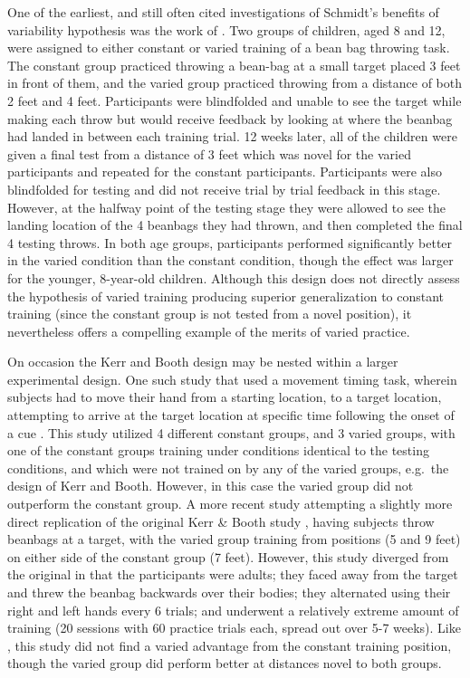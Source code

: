 \documentclass[
  12pt,
  letterpaper,
]{article}
\begin{document}
One of the earliest, and still often cited investigations of Schmidt's
benefits of variability hypothesis was the work of
\textcite{kerrSpecificVariedPractice1978}. Two groups of children, aged
8 and 12, were assigned to either constant or varied training of a bean
bag throwing task. The constant group practiced throwing a bean-bag at a
small target placed 3 feet in front of them, and the varied group
practiced throwing from a distance of both 2 feet and 4 feet.
Participants were blindfolded and unable to see the target while making
each throw but would receive feedback by looking at where the beanbag
had landed in between each training trial. 12 weeks later, all of the
children were given a final test from a distance of 3 feet which was
novel for the varied participants and repeated for the constant
participants. Participants were also blindfolded for testing and did not
receive trial by trial feedback in this stage. However, at the halfway
point of the testing stage they were allowed to see the landing location
of the 4 beanbags they had thrown, and then completed the final 4
testing throws. In both age groups, participants performed significantly
better in the varied condition than the constant condition, though the
effect was larger for the younger, 8-year-old children. Although this
design does not directly assess the hypothesis of varied training
producing superior generalization to constant training (since the
constant group is not tested from a novel position), it nevertheless
offers a compelling example of the merits of varied practice.

On occasion the Kerr and Booth design may be nested within a larger
experimental design. One such study that used a movement timing task,
wherein subjects had to move their hand from a starting location, to a
target location, attempting to arrive at the target location at specific
time following the onset of a cue
\autocite{wrisbergVariabilityPracticeHypothesis1987}. This study
utilized 4 different constant groups, and 3 varied groups, with one of
the constant groups training under conditions identical to the testing
conditions, and which were not trained on by any of the varied groups,
e.g.~the design of Kerr and Booth. However, in this case the varied
group did not outperform the constant group. A more recent study
attempting a slightly more direct replication of the original Kerr \&
Booth study \autocite{willeyLongtermMotorLearning2018}, having subjects
throw beanbags at a target, with the varied group training from
positions (5 and 9 feet) on either side of the constant group (7 feet).
However, this study diverged from the original in that the participants
were adults; they faced away from the target and threw the beanbag
backwards over their bodies; they alternated using their right and left
hands every 6 trials; and underwent a relatively extreme amount of
training (20 sessions with 60 practice trials each, spread out over 5-7
weeks). Like \textcite{wrisbergVariabilityPracticeHypothesis1987}, this
study did not find a varied advantage from the constant training
position, though the varied group did perform better at distances novel
to both groups.
\end{document}
